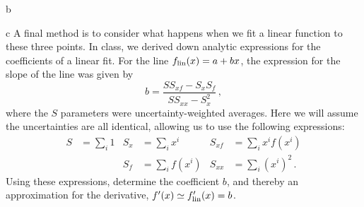 \documentclass[]{homework}
\begin{document}
\begin{problem}{2}
\begin{subproblem}{b}
  \end{subproblem}
  \begin{subproblem}{c}
    A final method is to consider what happens when we fit a linear function to these three points.
    In class, we derived down analytic expressions for the coefficients of a
    linear fit. For the line $f_{\rm lin}(x) = a + b x$, the expression for the slope of the
    line was given by
    \[
      b = \frac{S S_{xf} - S_x S_f}{S S_{xx} - S_x^2}\,,
    \]
    where the $S$ parameters were uncertainty-weighted averages. Here we will assume
    the uncertainties are all identical, allowing us to use the following expressions:
    \begin{align*}
      S  & = \sum_i 1  & S_{x} & = \sum_i x^i     & S_{xf} & = \sum_i x^i f(x^i) \\
         &             & S_{f} & = \sum_i f(x^i)  & S_{xx} & = \sum_i (x^i)^2\,.
    \end{align*}
    Using these expressions, determine the coefficient $b$, and thereby an approximation for the
    derivative, $f'(x) \simeq f'_{\rm lin}(x) = b$.
  \end{subproblem}

\end{problem}
\end{document}
